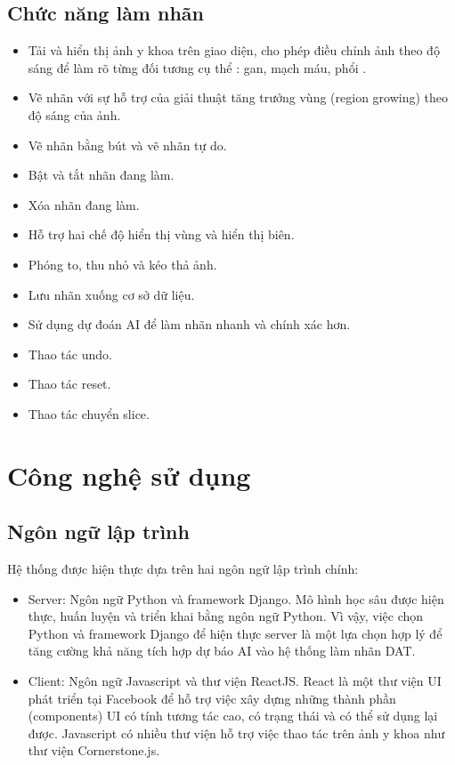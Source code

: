 \subsection{Chức năng làm nhãn}
\begin{itemize}
    \item Tải và hiển thị ảnh y khoa trên giao diện, cho phép điều chỉnh ảnh theo độ sáng để làm rõ từng đối tương cụ thể : gan, mạch máu, phổi .
    \item Vẽ nhãn với sự hỗ trợ của giải thuật tăng trưởng vùng (region growing) theo độ sáng của ảnh. 
    \item Vẽ nhãn bằng bút và vẽ nhãn tự do.
    \item Bật và tắt nhãn đang làm. 
    \item Xóa nhãn đang làm. 
    \item Hỗ trợ hai chế độ hiển thị vùng và hiển thị biên.
    \item Phóng to, thu nhỏ và kéo thả ảnh.
    \item Lưu nhãn xuống cơ sở dữ liệu.
    \item Sử dụng dự đoán AI để làm nhãn nhanh và chính xác hơn.
    \item Thao tác undo.
    \item Thao tác reset.
    \item Thao tác chuyển slice.
\end{itemize}

\section{Công nghệ sử dụng}
\subsection{Ngôn ngữ lập trình}
Hệ thống được hiện thực dựa trên hai ngôn ngữ lập trình chính: 
\begin{itemize}
    \item Server: Ngôn ngữ Python và framework Django. Mô hình học sâu được hiện thực, huấn luyện và triển khai bằng ngôn ngữ Python. Vì vậy, việc chọn Python và framework Django để hiện thực server là một lựa chọn hợp lý để tăng cường khả năng tích hợp dự báo AI vào hệ thống làm nhãn DAT. 
    \item Client: Ngôn ngữ Javascript và thư viện ReactJS. React là một thư viện UI phát triển tại Facebook để hỗ trợ việc xây dựng những thành phần (components) UI có tính tương tác cao, có trạng thái và có thể sử dụng lại được. Javascript có nhiều thư viện hỗ trợ việc thao tác trên ảnh y khoa như thư viện Cornerstone.js. 
\end{itemize}

